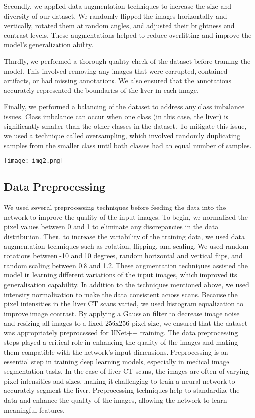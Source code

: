 \documentclass[conference]{IEEEtran}
\begin{document}
Secondly, we applied data augmentation techniques to increase the size and diversity of our dataset. We randomly flipped the images horizontally and vertically, rotated them at random angles, and adjusted their brightness and contrast levels. These augmentations helped to reduce overfitting and improve the model’s generalization ability.

Thirdly, we performed a thorough quality check of the dataset before training the model. This involved removing any images that were corrupted, contained artifacts, or had missing annotations. We also ensured that the annotations accurately represented the boundaries of the liver in each image.

Finally, we performed a balancing of the dataset to address any class imbalance issues. Class imbalance can occur when one class (in this case, the liver) is significantly smaller than the other classes in the dataset. To mitigate this issue, we used a technique called oversampling, which involved randomly duplicating samples from the smaller class until both classes had an equal number of samples.


\texttt{[image: img2.png]}

\subsection{Data Preprocessing}\label{SCM}
We used several preprocessing techniques before feeding the data into the network to improve the quality of the input images. To begin, we normalized the pixel values between 0 and 1 to eliminate any discrepancies in the data distribution. Then, to increase the variability of the training data, we used data augmentation techniques such as rotation, flipping, and scaling. We used random rotations between -10 and 10 degrees, random horizontal and vertical flips, and random scaling between 0.8 and 1.2. These augmentation techniques assisted the model in learning different variations of the input images, which improved its generalization capability.
In addition to the techniques mentioned above, we used intensity normalization to make the data consistent across scans. Because the pixel intensities in the liver CT scans varied, we used histogram equalization to improve image contrast. By applying a Gaussian filter to decrease image noise and resizing all images to a fixed 256x256 pixel size, we ensured that the dataset was appropriately preprocessed for UNet++ training. The data preprocessing steps played a critical role in enhancing the quality of the images and making them compatible with the network's input dimensions.
Preprocessing is an essential step in training deep learning models, especially in medical image segmentation tasks. In the case of liver CT scans, the images are often of varying pixel intensities and sizes, making it challenging to train a neural network to accurately segment the liver. Preprocessing techniques help to standardize the data and enhance the quality of the images, allowing the network to learn meaningful features.
\end{document}
